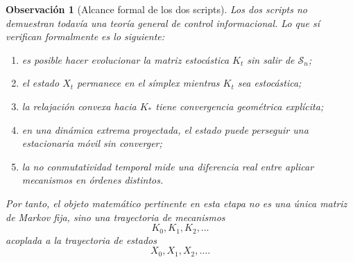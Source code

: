 \documentclass[12pt]{article}
\newtheorem{observacion}{Observación}[section]
\begin{document}
\begin{observacion}[Alcance formal de los dos scripts]
Los dos scripts no demuestran todavía una teoría general de control informacional.
Lo que sí verifican formalmente es lo siguiente:
\begin{enumerate}[label=\textup{(\roman*)}]
\item es posible hacer evolucionar la matriz estocástica \(K_t\) sin salir de
\(\mathcal S_n\);
\item el estado \(X_t\) permanece en el símplex mientras \(K_t\) sea estocástica;
\item la relajación convexa hacia \(K_\ast\) tiene convergencia geométrica
explícita;
\item en una dinámica extrema proyectada, el estado puede perseguir una
estacionaria móvil sin converger;
\item la no conmutatividad temporal mide una diferencia real entre aplicar
mecanismos en órdenes distintos.
\end{enumerate}
Por tanto, el objeto matemático pertinente en esta etapa no es una única matriz
de Markov fija, sino una trayectoria de mecanismos
\[
K_0,K_1,K_2,\dots
\]
acoplada a la trayectoria de estados
\[
X_0,X_1,X_2,\dots.
\]
\end{observacion}


%
%
%

%
%
%
%
%
%
\end{document}

